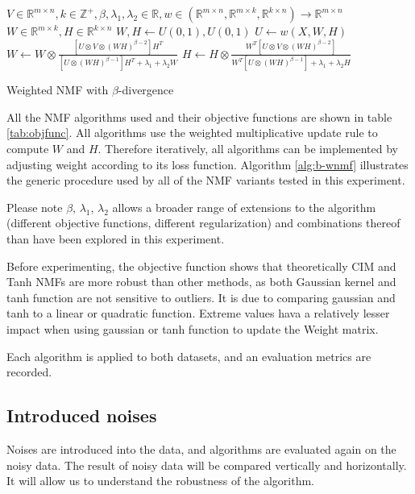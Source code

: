 \documentclass{article} %
\begin{document}
\begin{algorithm}
\begin{algorithmic}
\REQUIRE $V \in \mathbb{R}^{m \times n}, k \in \mathbb{Z}^+, \beta,\lambda_1,\lambda_2 \in \mathbb{R},w \in \left(\mathbb{R}^{m \times n}, \mathbb{R}^{m \times k}, \mathbb{R}^{k \times n}\right) \to \mathbb{R}^{m \times n}$
\ENSURE $W \in \mathbb{R}^{m \times k}, H \in \mathbb{R}^{k \times n}$
\STATE $W,H \gets U\left(0,1\right),U\left(0,1\right)$
\REPEAT
  \STATE $U \gets w\left(X,W,H\right)$
  \STATE $W \gets W \otimes \frac{\left[U \otimes V \otimes \left(WH\right)^{\beta-2}\right] H^T}{\left[U \otimes \left(WH\right)^{\beta-1}\right]H^T + \lambda_1 + \lambda_2 W}$
  \STATE $H \gets H \otimes \frac{W^T \left[U \otimes V \otimes \left(WH\right)^{\beta-2}\right]}{W^T \left[U \otimes \left(WH\right)^{\beta-1}\right] + \lambda_1 + \lambda_2 H}$
\end{algorithmic}
\caption{Weighted NMF with $\beta$-divergence \label{alg:b-wnmf}}
\end{algorithm}

All the NMF algorithms used and their objective functions are shown in table \ref{tab:objfunc}. All algorithms use the weighted multiplicative update rule to compute $W$ and $H$. Therefore iteratively, all algorithms can be implemented by adjusting weight according to its loss function. \cite{arora} Algorithm \ref{alg:b-wnmf} illustrates the generic procedure used by all of the NMF variants tested in this experiment.

Please note $\beta$, $\lambda_1$, $\lambda_2$ allows a broader range of extensions to the algorithm (different objective functions, different regularization) and combinations thereof than have been explored in this experiment.

Before experimenting, the objective function shows that theoretically CIM and Tanh NMFs are more robust than other methods, as both Gaussian kernel and tanh function are not sensitive to outliers. It is due to comparing gaussian and tanh to a linear or quadratic function. Extreme values hava a relatively lesser impact when using gaussian or tanh function to update the Weight matrix. 

Each algorithm is applied to both datasets, and an evaluation metrics are recorded.

\subsection{Introduced noises}
Noises are introduced into the data, and algorithms are evaluated again on the noisy data. The result of noisy data will be compared vertically and horizontally. It will allow us to understand the robustness of the algorithm.
\end{document}
